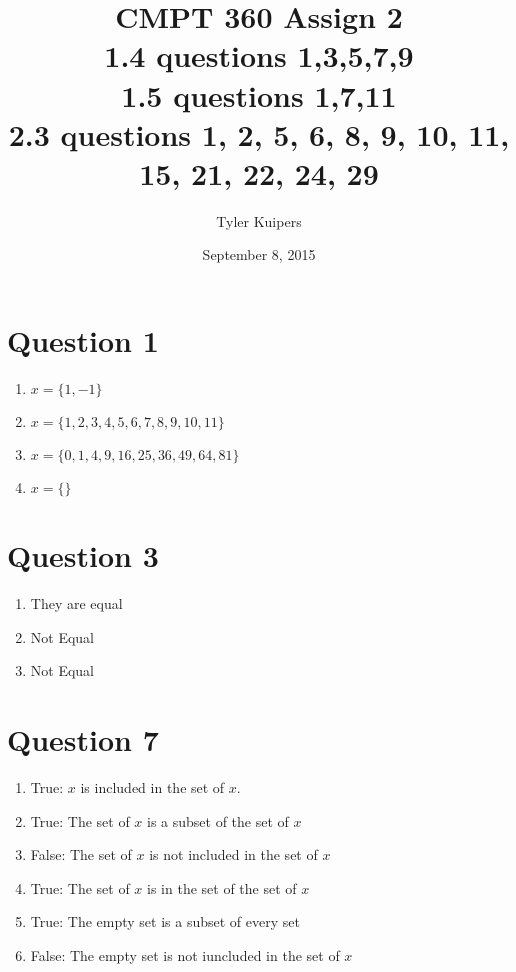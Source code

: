 \documentclass[12pt]{extarticle}
\title{CMPT 360 Assign 2 \\1.4 questions 1,3,5,7,9\\1.5 questions 1,7,11\\2.3 questions 1, 2, 5, 6, 8, 9, 10, 11, 15, 21, 22, 24, 29}
\author{Tyler Kuipers}
\date{September 8, 2015}
\begin{document}
\maketitle
\section{}
\section*{Question 1}
	\begin{enumerate}
		\item $x=\{1,-1\}$
		\item $x=\{1,2,3,4,5,6,7,8,9,10,11\}$
		\item $x=\{0,1,4,9,16,25,36,49,64,81\} $
		\item $x=\{\}$
	\end{enumerate}

\section*{Question 3}
	\begin{enumerate}
		\item They are equal
		\item Not Equal
		\item Not Equal
	\end{enumerate}

\section*{Question 7}
	\begin{enumerate}
		\item True: $x$ is included in the set of $x$.
		\item True: The set of $x$ is a subset of the set of $x$
		\item False: The set of $x$ is not included in the set of $x$
		\item True: The set of $x$ is in the set of the set of $x$
		\item True: The empty set is a subset of every set
		\item False: The empty set is not iuncluded in the set of $x$
	\end{enumerate}
\end{document}

